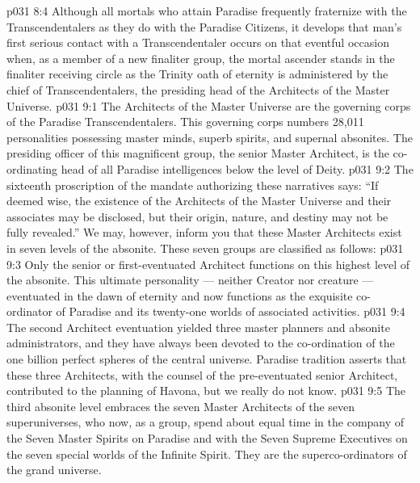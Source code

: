 \vs p031 8:4 Although all mortals who attain Paradise frequently fraternize with the Transcendentalers as they do with the Paradise Citizens, it develops that man’s first serious contact with a Transcendentaler occurs on that eventful occasion when, as a member of a new finaliter group, the mortal ascender stands in the finaliter receiving circle as the Trinity oath of eternity is administered by the chief of Transcendentalers, the presiding head of the Architects of the Master Universe.
\vs p031 9:1 The Architects of the Master Universe are the governing corps of the Paradise Transcendentalers. This governing corps numbers 28,011 personalities possessing master minds, superb spirits, and supernal absonites. The presiding officer of this magnificent group, the senior Master Architect, is the co\hyp{}ordinating head of all Paradise intelligences below the level of Deity.
\vs p031 9:2 The sixteenth proscription of the mandate authorizing these narratives says: “If deemed wise, the existence of the Architects of the Master Universe and their associates may be disclosed, but their origin, nature, and destiny may not be fully revealed.” We may, however, inform you that these Master Architects exist in seven levels of the absonite. These seven groups are classified as follows:
\vs p031 9:3 \bibnobreakspace {} Only the senior or first\hyp{}eventuated Architect functions on this highest level of the absonite. This ultimate personality --- neither Creator nor creature --- eventuated in the dawn of eternity and now functions as the exquisite co\hyp{}ordinator of Paradise and its twenty\hyp{}one worlds of associated activities.
\vs p031 9:4 \pc {}\bibnobreakspace {} The second Architect eventuation yielded three master planners and absonite administrators, and they have always been devoted to the co\hyp{}ordination of the one billion perfect spheres of the central universe. Paradise tradition asserts that these three Architects, with the counsel of the pre\hyp{}eventuated senior Architect, contributed to the planning of Havona, but we really do not know.
\vs p031 9:5 \pc {}\bibnobreakspace {} The third absonite level embraces the seven Master Architects of the seven superuniverses, who now, as a group, spend about equal time in the company of the Seven Master Spirits on Paradise and with the Seven Supreme Executives on the seven special worlds of the Infinite Spirit. They are the superco\hyp{}ordinators of the grand universe.
